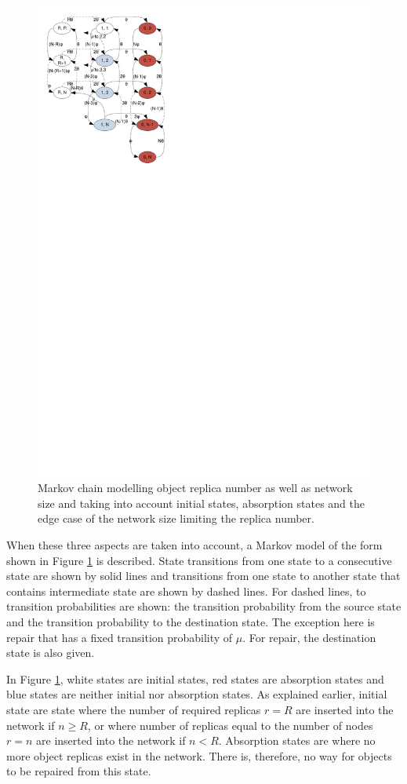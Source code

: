 \documentclass[10pt,a4paper,conference]{IEEEtran}
\begin{document}
\begin{figure}[htbp]
 \centering
 \includegraphics[clip=true, viewport=0.5cm 19.5cm 8.5cm 29.5cm, width=0.7\columnwidth]{Markov_chain_repair_compact}
 \caption{Markov chain modelling object replica number as well as network size and taking into account initial states, absorption states and the edge case of the network size limiting the replica number.}
 \label{fig_markov_chain}
\end{figure}
%
When these three aspects are taken into account, a Markov model of the form shown in Figure \ref{fig_markov_chain} is described. State transitions from one state to a consecutive state are shown by solid lines and transitions from one state to another state that contains intermediate state are shown by dashed lines. For dashed lines, to transition probabilities are shown: the transition probability from the source state and the transition probability to the destination state. The exception here is repair that has a fixed transition probability of $\mu$. For repair, the destination state is also given.

In Figure \ref{fig_markov_chain}, white states are initial states, red states are absorption states and blue states are neither initial nor absorption states. As explained earlier, initial state are state where the number of required replicas $r=R$ are inserted into the network if $n\geq R$, or where number of replicas equal to the number of nodes $r=n$ are inserted into the network if $n < R$. Absorption states are where no more object replicas exist in the network. There is, therefore, no way for objects to be repaired from this state.
\end{document}
